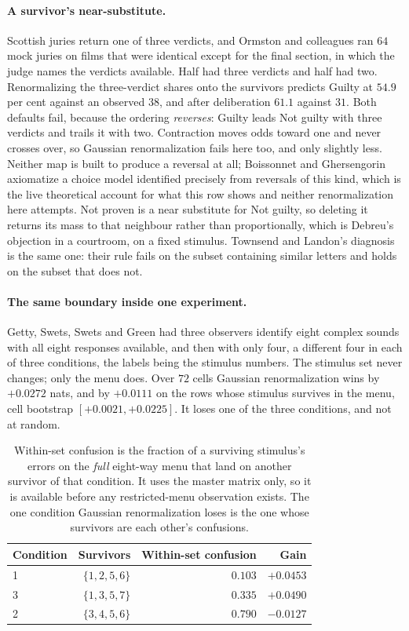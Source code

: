 \documentclass[11pt]{article}
\begin{document}
\paragraph{A survivor's near-substitute.} Scottish juries return one of three verdicts, and
Ormston and colleagues \cite{ormston2019} ran $64$ mock juries on films that were identical
except for the final section, in which the judge names the verdicts available. Half had
three verdicts and half had two. Renormalizing the three-verdict shares onto the survivors
predicts Guilty at $54.9$ per cent against an observed $38$, and after deliberation $61.1$
against $31$. Both defaults fail, because the ordering \emph{reverses}: Guilty leads Not
guilty with three verdicts and trails it with two. Contraction moves odds toward one and
never crosses over, so Gaussian renormalization fails here too, and only slightly less. Neither
map is built to produce a reversal at all; Boissonnet and Ghersengorin \cite{boissonnet2025}
axiomatize a choice model identified precisely from reversals of this kind, which is the live
theoretical account for what this row shows and neither renormalization here attempts. Not proven is a near
substitute for Not guilty, so deleting it returns its mass to that neighbour rather than
proportionally, which is Debreu's objection in a courtroom, on a fixed stimulus. Townsend and
Landon's diagnosis \cite{townsendlandon1982} is the same one: their rule fails on the subset
containing similar letters and holds on the subset that does not.

\paragraph{The same boundary inside one experiment.} Getty, Swets, Swets and Green
\cite{getty1979} had three observers identify eight complex sounds with all eight responses
available, and then with only four, a different four in each of three conditions, the labels
being the stimulus numbers. The stimulus set never changes; only the menu does. Over $72$
cells Gaussian renormalization wins by $+0.0272$ nats, and by $+0.0111$ on the rows whose stimulus survives
in the menu, cell bootstrap $[+0.0021, +0.0225]$. It loses one of the three conditions, and not
at random.

\begin{table}[ht]
\centering
\small
\begin{tabular}{lrrr}
\toprule
Condition & Survivors & Within-set confusion & Gain \\
\midrule
1 & $\{1,2,5,6\}$ & $0.103$ & $+0.0453$ \\
3 & $\{1,3,5,7\}$ & $0.335$ & $+0.0490$ \\
2 & $\{3,4,5,6\}$ & $0.790$ & $-0.0127$ \\
\bottomrule
\end{tabular}
\caption{Within-set confusion is the fraction of a surviving stimulus's errors on the
\emph{full} eight-way menu that land on another survivor of that condition. It uses the
master matrix only, so it is available before any restricted-menu observation exists. The one condition Gaussian renormalization loses is the one whose survivors are each other's confusions.}
\label{tab:getty}
\end{table}
\end{document}
